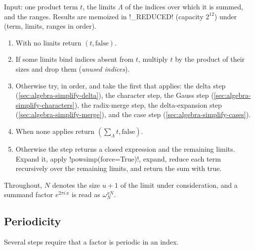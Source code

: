 \begin{algorithm}\label{alg:algebra-reduce-term}
Input: one product term $t$, the limits $\Lambda$ of the indices over which it is summed, and the ranges. Results are memoized in \py!_REDUCED! (capacity $2^{12}$) under (term, limits, ranges in order).
\begin{enumerate}
\item With no limits return $(t,\text{false})$.
\item If some limits bind indices absent from $t$, multiply $t$ by the product of their sizes and drop them (\emph{unused indices}).
\item Otherwise try, in order, and take the first that applies: the delta step (\cref{sec:algebra-simplify-delta}), the character step, the Gauss step (\cref{sec:algebra-simplify-characters}), the radix-merge step, the delta-expansion step (\cref{sec:algebra-simplify-merge}), and the case step (\cref{sec:algebra-simplify-cases}).
\item When none applies return $(\sum_\Lambda t,\text{false})$.
\item Otherwise the step returns a closed expression and the remaining limits. Expand it, apply \py!powsimp(force=True)!, expand, reduce each term recursively over the remaining limits, and return the sum with true.
\end{enumerate}
\end{algorithm}

Throughout, $N$ denotes the size $u+1$ of the limit under consideration, and a summand factor $e^{2\pi i\,x}$ is read as $\omega_N^{xN}$.

\subsection{Periodicity}\label{sec:algebra-simplify-periodic}

Several steps require that a factor is periodic in an index.


